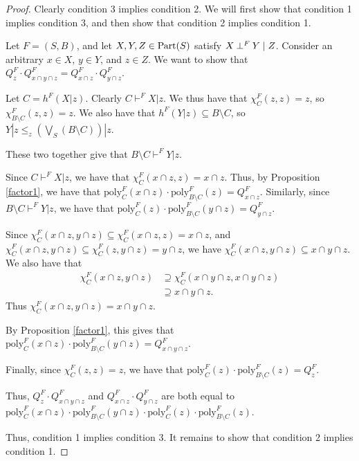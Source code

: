 \documentclass[authordate,onecolumn]{miri-tech-article}
\begin{document}
\begin{proof}
Clearly condition 3 implies condition 2. We will first show that condition 1 implies condition 3, and then show that condition 2 implies condition 1. 

Let $F=(S,B)$, and let $X,Y,Z\in \text{Part}(S)$ satisfy $X\mathbin{\perp^{F}}Y\mid Z$. Consider an arbitrary $x\in X$, $y\in Y$, and $z\in Z$. We want to show that $Q^F_{z} \cdot Q^F_{x\cap y\cap z}=Q^F_{x\cap z} \cdot Q^F_{y\cap z}$. 

Let $C=h^F(X|z)$. Clearly $C\vdash^F X|z$. We thus have that  $\chi^F_C(z,z)=z$, so $\chi^F_{B\setminus C}(z,z)=z$. We also have that $h^F(Y|z)\subseteq B\setminus C$, so $Y|z\leq_z(\bigvee_S(B\setminus C))|z$.

These two together give that $B\setminus C\vdash^F Y|z$.

Since $C\vdash^F X|z$, we have that $\chi^F_C(x\cap z,z)=x\cap z$. Thus, by Proposition \ref{factor1}, we have that $\text{poly}^F_C(x\cap z)\cdot \text{poly}^F_{B\setminus C}(z)=Q^F_{x\cap z}$. Similarly, since $B\setminus C\vdash^F Y|z$, we have that $\text{poly}^F_C(z)\cdot \text{poly}^F_{B\setminus C}(y\cap z)=Q^F_{y\cap z}$.

Since $\chi^F_C(x\cap z,y\cap z)\subseteq \chi^F_C(x\cap z, z)=x\cap z$, and $\chi^F_C(x\cap z,y\cap z)\subseteq \chi^F_C(z,y\cap z)=y\cap z$, we have $\chi^F_C(x\cap z,y\cap z)\subseteq x\cap y\cap z$. We also have that
\begin{equation} \begin{split} \chi^F_C(x\cap z,y\cap z) & \supseteq \chi^F_C(x\cap y\cap z,x\cap y\cap z) \\ & \supseteq x\cap y\cap z. \end{split} \end{equation}
Thus $\chi^F_C(x\cap z,y\cap z)= x\cap y\cap z$.

By Proposition \ref{factor1}, this gives that $\text{poly}^F_C(x\cap z)\cdot \text{poly}^F_{B\setminus C}(y\cap z)=Q^F_{x\cap y\cap z}$.

Finally, since $\chi^F_C(z,z)=z$, we have that $\text{poly}^F_C(z)\cdot \text{poly}^F_{B\setminus C}(z)=Q^F_{z}$.

Thus, $Q^F_{z}\cdot Q^F_{x\cap y\cap z}$ and $Q^F_{x\cap z} \cdot Q^F_{y\cap z}$ are both equal to $\text{poly}^F_C(x\cap z)\cdot \text{poly}^F_{B\setminus C}(y\cap z)\cdot\text{poly}^F_C(z)\cdot \text{poly}^F_{B\setminus C}(z)$.

Thus, condition 1 implies condition 3. It remains to show that condition 2 implies condition 1. 


\end{proof}
\end{document}
